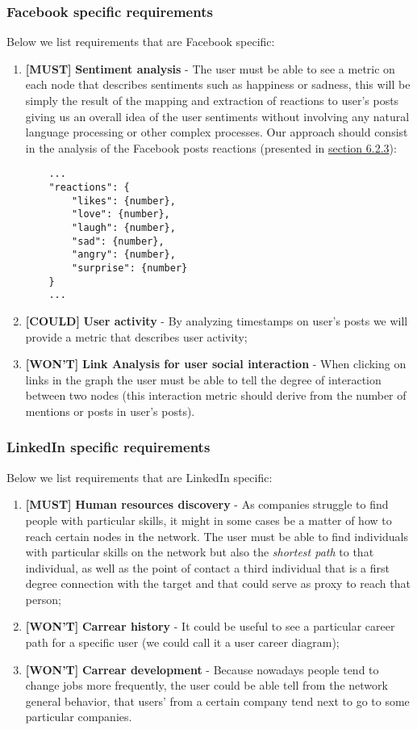 \subsubsection*{Facebook specific requirements}

Below we list requirements that are Facebook specific:

\begin{enumerate}
    \item \textbf{[MUST]} \textbf{Sentiment analysis} - The user must be able to see a metric on each node that describes sentiments such as happiness or sadness, this will be simply the result of the mapping and extraction of reactions to user's posts giving us an overall idea of the user sentiments without involving any natural language processing or other complex processes. Our approach should consist in the analysis of the Facebook posts reactions (presented in \hyperref[sec:dataminer]{section 6.2.3}):
    \begin{verbatim}
    ...
    "reactions": {
        "likes": {number},
        "love": {number},
        "laugh": {number},
        "sad": {number},
        "angry": {number},
        "surprise": {number}
    }
    ...
    \end{verbatim}
    \item \textbf{[COULD]} \textbf{User activity} - By analyzing timestamps on user's posts we will provide a metric that describes user activity;
    \item \textbf{[WON'T]} \textbf{Link Analysis for user social interaction} - When clicking on links in the graph the user must be able to tell the degree of interaction between two nodes (this interaction metric should derive from the number of mentions or posts in user's posts).
\end{enumerate}

\subsubsection*{LinkedIn specific requirements}

Below we list requirements that are LinkedIn specific:

\begin{enumerate}
    \item \textbf{[MUST]} \textbf{Human resources discovery} - As companies struggle to find people with particular skills, it might in some cases be a matter of how to reach certain nodes in the network. The user must be able to find individuals with particular skills on the network but also the \textit{shortest path} to that individual, as well as the point of contact a third individual that is a first degree connection with the target and that could serve as proxy to reach that person;
    \item \textbf{[WON'T]} \textbf{Carrear history} - It could be useful to see a particular career path for a specific user (we could call it a user career diagram);
    \item \textbf{[WON'T]} \textbf{Carrear development} - Because nowadays people tend to change jobs more frequently, the user could be able tell from the network general behavior, that users' from a certain company tend next to go to some particular companies.
\end{enumerate}
